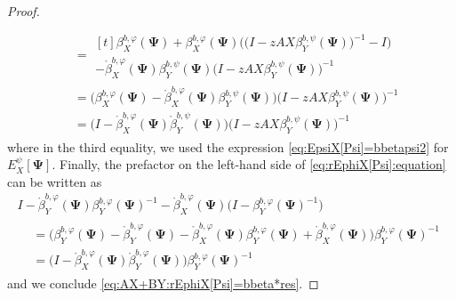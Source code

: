 \documentclass[12pt]{amsart}
\newcommand{\bPsi}{\boldsymbol{\Psi{}}}
\newcommand\bub[1]{\mathring{#1}}
\newcommand{\bbetas}[2]{\beta^{b,#1}_{#2}}
\newcommand{\bubbetas}[2]{\bub{\beta}^{b,#1}_{#2}}
\theoremstyle{definition}
\numberwithin{equation}{section}
\begin{document}
\begin{proof}
\begin{multline}
\begin{aligned}
      \\
      &=
      \begin{multlined}[t]
        \bbetas{\varphi}{X}(\bPsi)
        +
        \bbetas{\varphi}{X}(\bPsi)
        \bigl(
        \bigl(
        I-zAX\bbetas{\psi}{Y}(\bPsi)
        \bigr)^{-1}
        -I
        \bigr)\\
        -
        \bubbetas{\varphi}{X}(\bPsi)
        \bbetas{\psi}{Y}(\bPsi)
        \bigl(
        I-zAX\bbetas{\psi}{Y}(\bPsi)
        \bigr)^{-1}
      \end{multlined}
      \\
      &=
      \bigl(
      \bbetas{\varphi}{X}(\bPsi)
      -
      \bubbetas{\varphi}{X}(\bPsi)
      \bbetas{\psi}{Y}(\bPsi)
      \bigr)
      \bigl(
      I-zAX\bbetas{\psi}{Y}(\bPsi)
      \bigr)^{-1}
      \\
      &=
      \bigl(
      I
      -
      \bubbetas{\varphi}{X}(\bPsi)
      \bubbetas{\psi}{Y}(\bPsi)
      \bigr)
      \bigl(
      I-zAX\bbetas{\psi}{Y}(\bPsi)
      \bigr)^{-1}
    \end{aligned}
  \end{multline}
  where in the third equality, we used the expression   \eqref{eq:EpsiX[Psi]=bbetapsi2} for $E^\psi_X[\bPsi]$.
  Finally, the prefactor on the left-hand side of \eqref{eq:rEphiX[Psi]:equation} can be written as
  \begin{multline*}
    I-
    \bubbetas{\varphi}{Y}(\bPsi)
    \bbetas{\varphi}{Y}(\bPsi)^{-1}
    -
    \bubbetas{\varphi}{X}(\bPsi)
    \bigl(
    I-\bbetas{\varphi}{Y}(\bPsi)^{-1} 
    \bigr)
    \\
    \begin{aligned}
      &=
      \bigl(
      \bbetas{\varphi}{Y}(\bPsi)
      - \bubbetas{\varphi}{Y}(\bPsi)
      - \bubbetas{\varphi}{X}(\bPsi)
      \bbetas{\varphi}{Y}(\bPsi)
      + \bubbetas{\varphi}{X}(\bPsi)
      \bigr)
      \bbetas{\varphi}{Y}(\bPsi)^{-1}
      \\
      &=
      \bigl(
      I - \bubbetas{\varphi}{X}(\bPsi)
      \bubbetas{\varphi}{Y}(\bPsi)
      \bigr)
      \bbetas{\varphi}{Y}(\bPsi)^{-1}
    \end{aligned}
  \end{multline*}
  and we conclude 
  \eqref{eq:AX+BY:rEphiX[Psi]=bbeta*res}.



\end{proof}
\end{document}
